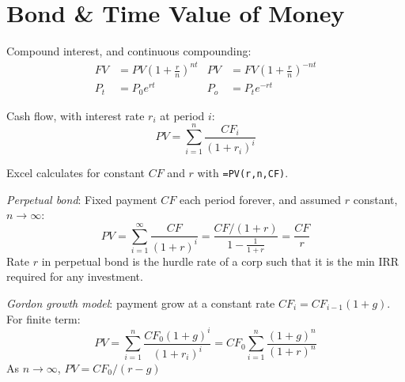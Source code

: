 \documentclass[9pt,twocolumn]{extarticle}
\begin{document}
\section{Bond \& Time Value of Money}

Compound interest, and continuous compounding:
\begin{align*}
FV &= PV\left(1+\frac{r}{n}\right)^{nt}  &  PV &= FV\left(1+\frac{r}{n}\right)^{-nt} \\
P_t &= P_0 e^{rt}                        &  P_o &= P_t e^{-rt}
\end{align*}

Cash flow, with interest rate $r_i$ at period $i$:
$$ PV = \sum_{i=1}^n \frac{CF_i}{(1+r_i)^i} $$

Excel calculates for constant $CF$ and $r$ with \texttt{=PV(r,n,CF)}.

\emph{Perpetual bond}: Fixed payment $CF$ each period forever, and assumed $r$ constant, $n\to\infty$:
$$ PV = \sum_{i=1}^{\infty} \frac{CF}{(1+r)^i} = \frac{CF/(1+r)}{1-\frac{1}{1+r}} = \frac{CF}{r} $$
Rate $r$ in perpetual bond is the hurdle rate of a corp such that it is the min
IRR required for any investment.

\emph{Gordon growth model}: payment grow at a constant rate $CF_i = CF_{i-1}(1+g)$. For finite term:
$$ PV = \sum_{i=1}^n \frac{CF_0(1+g)^i}{(1+r_i)^i} = CF_0\sum_{i=1}^n \frac{(1+g)^n}{(1+r)^n} $$
As $n\to\infty$, $ PV =  CF_0/(r-g) $
\end{document}
